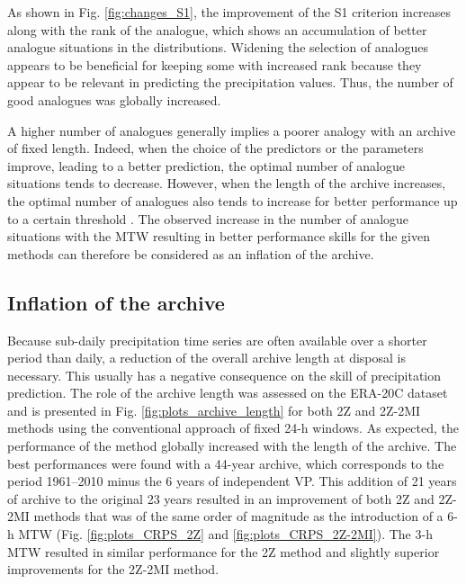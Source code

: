 \documentclass[hess, manuscript]{copernicus}
\begin{document}
	As shown in Fig. \ref{fig:changes_S1}, the improvement of the S1 criterion increases along with the rank of the analogue, which shows an accumulation of better analogue situations in the distributions. Widening the selection of analogues appears to be beneficial for keeping some with increased rank because they appear to be relevant in predicting the precipitation values. Thus, the number of good analogues was globally increased.
	
	A higher number of analogues generally implies a poorer analogy with an archive of fixed length. Indeed, when the choice of the predictors or the parameters improve, leading to a better prediction, the optimal number of analogue situations tends to decrease. However, when the length of the archive increases, the optimal number of analogues also tends to increase for better performance up to a certain threshold \citep[][]{Bontron2004, Hamill2006a}. The observed increase in the number of analogue situations with the MTW resulting in better performance skills for the given methods can therefore be considered as an inflation of the archive.
	
	
	\subsection{Inflation of the archive}
	\label{sec:archive_reduction}
	
	Because sub-daily precipitation time series are often available over a shorter period than daily, a reduction of the overall archive length at disposal is necessary. This usually has a negative consequence on the skill of precipitation prediction. The role of the archive length was assessed on the ERA-20C dataset and is presented in Fig. \ref{fig:plots_archive_length} for both 2Z and 2Z-2MI methods using the conventional approach of fixed 24-h windows. As expected, the performance of the method globally increased with the length of the archive. The best performances were found with a 44-year archive, which corresponds to the period 1961--2010 minus the 6 years of independent VP. This addition of 21 years of archive to the original 23 years resulted in an improvement of both 2Z and 2Z-2MI methods that was of the same order of magnitude as the introduction of a 6-h MTW (Fig. \ref{fig:plots_CRPS_2Z} and \ref{fig:plots_CRPS_2Z-2MI}). The 3-h MTW resulted in similar performance for the 2Z method and slightly superior improvements for the 2Z-2MI method.
	
\end{document}
